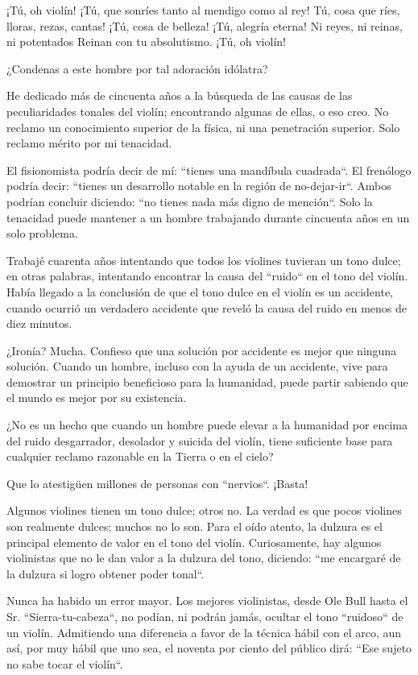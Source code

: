 \documentclass[12pt]{book}
\begin{document}
¡Tú, oh violín!
¡Tú, que sonríes tanto al mendigo como al rey!
Tú, cosa que ríes, lloras, rezas, cantas!
¡Tú, cosa de belleza!
¡Tú, alegría eterna!
Ni reyes, ni reinas, ni potentados
Reinan con tu absolutismo.
¡Tú, oh violín!

¿Condenas a este hombre por tal adoración idólatra?

He dedicado más de cincuenta años a la búsqueda de las causas de las peculiaridades tonales del violín; encontrando algunas de ellas, o eso creo. No reclamo un conocimiento superior de la física, ni una penetración superior. Solo reclamo mérito por mi tenacidad.

El fisionomista podría decir de mí: ``tienes una mandíbula cuadrada``. El frenólogo podría decir: ``tienes un desarrollo notable en la región de no-dejar-ir``. Ambos podrían concluir diciendo: ``no tienes nada más digno de mención``. Solo la tenacidad puede mantener a un hombre trabajando durante cincuenta años en un solo problema.

Trabajé cuarenta años intentando que todos los violines tuvieran un tono dulce; en otras palabras, intentando encontrar la causa del ``ruido`` en el tono del violín. Había llegado a la conclusión de que el tono dulce en el violín es un accidente, cuando ocurrió un verdadero accidente que reveló la causa del ruido en menos de diez minutos.

¿Ironía?
Mucha.
Confieso que una solución por accidente es mejor que ninguna solución. Cuando un hombre, incluso con la ayuda de un accidente, vive para demostrar un principio beneficioso para la humanidad, puede partir sabiendo que el mundo es mejor por su existencia.

¿No es un hecho que cuando un hombre puede elevar a la humanidad por encima del ruido desgarrador, desolador y suicida del violín, tiene suficiente base para cualquier reclamo razonable en la Tierra o en el cielo?

Que lo atestigüen millones de personas con ``nervios``.
¡Basta!

Algunos violines tienen un tono dulce; otros no.
La verdad es que pocos violines son realmente dulces; muchos no lo son.
Para el oído atento, la dulzura es el principal elemento de valor en el tono del violín. Curiosamente, hay algunos violinistas que no le dan valor a la dulzura del tono, diciendo: ``me encargaré de la dulzura si logro obtener poder tonal``.

Nunca ha habido un error mayor.
Los mejores violinistas, desde Ole Bull hasta el Sr. ``Sierra-tu-cabeza``, no podían, ni podrán jamás, ocultar el tono ``ruidoso`` de un violín. Admitiendo una diferencia a favor de la técnica hábil con el arco, aun así, por muy hábil que uno sea, el noventa por ciento del público dirá: ``Ese sujeto no sabe tocar el violín``.
\end{document}
